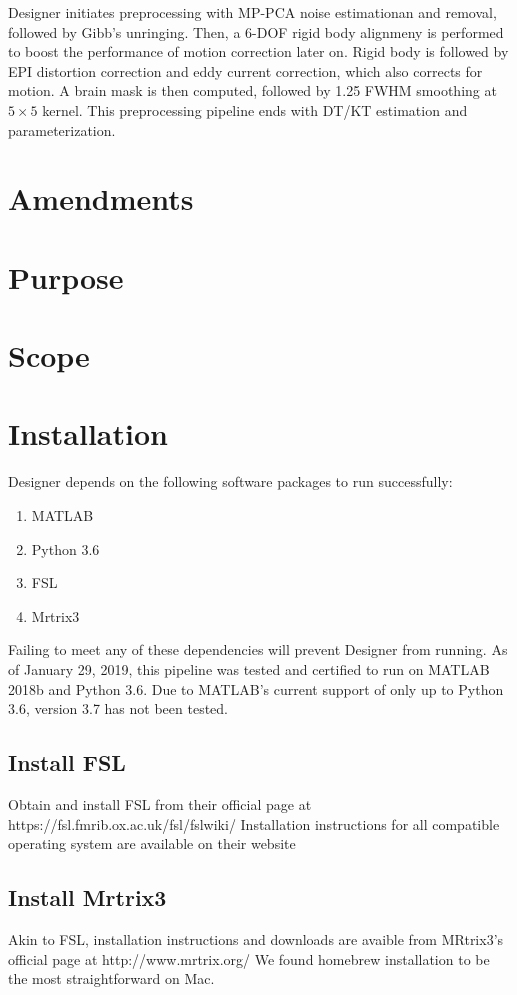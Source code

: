 \documentclass[12pt]{sop}
\begin{document}
Designer initiates preprocessing with MP-PCA noise estimationan and removal, followed by Gibb's unringing. Then, a 6-DOF rigid body alignmeny is performed to boost the performance of motion correction later on. Rigid body is followed by EPI distortion correction and eddy current correction, which also corrects for motion. A brain mask is then computed, followed by 1.25 FWHM smoothing at $5 \times 5$ kernel. This preprocessing pipeline ends with DT/KT estimation and parameterization.

\section{Amendments}

\section{Purpose}

\section{Scope}

\section{Installation}
Designer depends on the following software packages to run successfully:
\begin{enumerate}
\item MATLAB
\item Python 3.6
\item FSL
\item Mrtrix3
\end{enumerate}

Failing to meet any of these dependencies will prevent Designer from running. As of January 29, 2019, this pipeline was tested and certified to run on MATLAB 2018b and Python 3.6. Due to MATLAB's current support of only up to Python 3.6, version 3.7 has not been tested.

\subsection{Install FSL}
Obtain and install FSL from their official page at https://fsl.fmrib.ox.ac.uk/fsl/fslwiki/
Installation instructions for all compatible operating system are available on their website

\subsection{Install Mrtrix3}
Akin to FSL, installation instructions and downloads are avaible from MRtrix3's official page at http://www.mrtrix.org/
We found homebrew installation to be the most straightforward on Mac.
\end{document}
